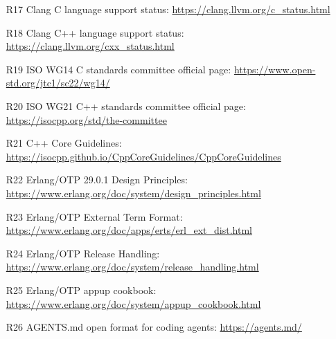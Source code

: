 \documentclass[11pt]{article}
\begin{document}
\begin{itemize}
  \item [R17] Clang C language support status: \url{https://clang.llvm.org/c\_status.html}
  \item [R18] Clang C++ language support status: \url{https://clang.llvm.org/cxx\_status.html}
  \item [R19] ISO WG14 C standards committee official page: \url{https://www.open-std.org/jtc1/sc22/wg14/}
  \item [R20] ISO WG21 C++ standards committee official page: \url{https://isocpp.org/std/the-committee}
  \item [R21] C++ Core Guidelines: \url{https://isocpp.github.io/CppCoreGuidelines/CppCoreGuidelines}
  \item [R22] Erlang/OTP 29.0.1 Design Principles: \url{https://www.erlang.org/doc/system/design\_principles.html}
  \item [R23] Erlang/OTP External Term Format: \url{https://www.erlang.org/doc/apps/erts/erl\_ext\_dist.html}
  \item [R24] Erlang/OTP Release Handling: \url{https://www.erlang.org/doc/system/release\_handling.html}
  \item [R25] Erlang/OTP appup cookbook: \url{https://www.erlang.org/doc/system/appup\_cookbook.html}
  \item [R26] AGENTS.md open format for coding agents: \url{https://agents.md/}
\end{itemize}
\end{document}
